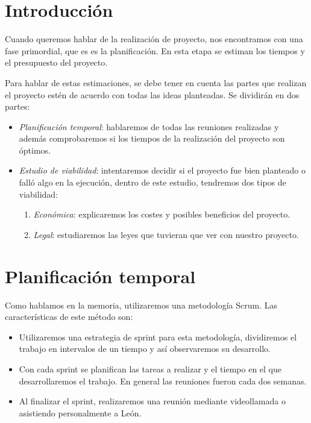 
\section{Introducción}

Cuando queremos hablar de la realización de proyecto, nos encontramos con una fase primordial, que es es la planificación. En esta etapa se estiman los tiempos y el presupuesto del proyecto. 

Para hablar de estas estimaciones, se debe tener en cuenta las partes que realizan el proyecto estén de acuerdo con todas las ideas planteadas. Se dividirán en dos partes: 

\begin{itemize}
	\item \textit{Planificación temporal}: hablaremos de todas las reuniones realizadas y además comprobaremos si los tiempos de la realización del proyecto son óptimos.
	\item \textit{Estudio de viabilidad}: intentaremos decidir si el proyecto fue bien planteado o falló algo en la ejecución, dentro de este estudio, tendremos dos tipos de viabilidad:
	\begin{enumerate}[a]
		\item \textit{Económica}: explicaremos los costes y posibles beneficios del proyecto.
		\item \textit{Legal}: estudiaremos las leyes que tuvieran que ver con nuestro proyecto.
	\end{enumerate}
\end{itemize}

\section{Planificación temporal}

Como hablamos en la memoria, utilizaremos una metodología Scrum. Las características de este método son:

\begin{itemize}
	\item Utilizaremos una estrategia de sprint para esta metodología, dividiremos el trabajo en intervalos de un tiempo y así observaremos su desarrollo.
	\item Con cada sprint se planifican las tareas a realizar y el tiempo en el que desarrollaremos el trabajo. En general las reuniones fueron cada dos semanas.
	\item Al finalizar el sprint, realizaremos una reunión mediante videollamada o asistiendo personalmente a León.
\end{itemize}

